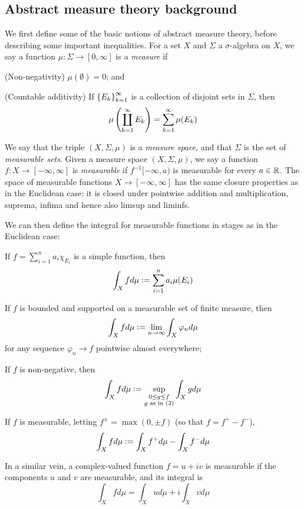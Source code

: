 \documentclass[11pt]{article}
\begin{document}
\subsection*{Abstract measure theory background}
We first define some of the basic notions of abstract measure theory, before describing some important inequalities. For a set $X$ and $\Sigma$ a $\sigma$-algebra on $X$, we say a function $\mu : \Sigma \to [0, \infty]$ is a \emph{measure} if
\begin{enum}
        \item (Non-negativity) $\mu(\emptyset) = 0$; and
        \item (Countable additivity) If $\left\{  E_k  \right\}_{k = 1}^\infty$ is a collection of disjoint sets in $\Sigma$, then
        $$
            \mu\left(  \coprod_{k = 1}^\infty E_k  \right) = \sum_{k = 1}^\infty \mu(E_k)
        $$
\end{enum}
We say that the triple $(X, \Sigma, \mu)$ is a \emph{measure space}, and that $\Sigma$ is the set of \emph{measurable sets}. Given a measure space $(X, \Sigma, \mu)$, we say a function $f : X \to [-\infty, \infty]$ is \emph{measurable} if $f^{-1}[-\infty, a)$ is measurable for every $a \in \mathbb{R}$. The space of measurable functions $X \to [-\infty, \infty]$ has the same closure properties as in the Euclidean case: it is closed under pointwise addition and multiplication, suprema, infima and hence also limsup and liminfs.

We can then define the integral for measurable functions in stages as in the Euclidean case:
\begin{enum}
    \item If $f = \sum_{i = 1}^n a_i\chi_{E_i}$ is a simple function, then 
    $$
        \int_X f d\mu \vcentcolon= \sum_{i = 1}^n a_i\mu(E_i)
    $$
    \item If $f$ is bounded and supported on a measurable set of finite measure, then 
    $$
        \int_X fd\mu \vcentcolon= \lim_{n \to \infty}\int_X \varphi_nd\mu
    $$ for any sequence $\varphi_n \to f$ pointwise almost everywhere;
    \item If $f$ is non-negative, then 
    $$
        \int_X fd\mu \vcentcolon= \sup_{\substack{0 \leq g \leq f \\ g \text{ as in }(2)}} \int_X gd\mu
    $$
    \item If $f$ is measurable, letting $f^\pm = \max(0, \pm f)$ (so that $f = f^+ - f^-$),
    $$
        \int_X fd\mu \vcentcolon= \int_X f^+d\mu - \int_X f^-d\mu
    $$
\end{enum}
In a similar vein, a complex-valued function $f = u + iv$ is measurable if the components $u$ and $v$ are measurable, and its integral is 
$$
    \int_X f d\mu = \int_X u d\mu + i\int_X v d\mu
$$
\end{document}
